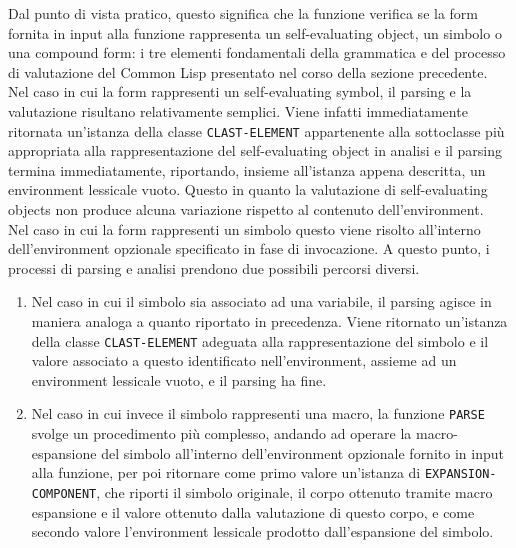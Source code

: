 Dal punto di vista pratico, questo significa che la funzione verifica se la
form fornita in input alla funzione rappresenta un self-evaluating object, un
simbolo o una compound form: i tre elementi fondamentali della grammatica e
del processo di valutazione del Common Lisp presentato nel corso della sezione
precedente.\\

Nel caso in cui la form rappresenti un self-evaluating symbol, il parsing e la
valutazione risultano relativamente semplici. Viene infatti immediatamente
ritornata un’istanza della classe \texttt{CLAST-ELEMENT} appartenente alla
sottoclasse più appropriata alla rappresentazione del self-evaluating object
in analisi e il parsing termina immediatamente, riportando, insieme
all’istanza appena descritta, un environment lessicale vuoto. Questo in quanto
la valutazione di self-evaluating objects non produce alcuna variazione
rispetto al contenuto dell'environment.\\

Nel caso in cui la form rappresenti un simbolo questo viene risolto
all’interno dell’environment opzionale specificato in fase di invocazione. A questo punto, i processi di parsing e analisi prendono due possibili percorsi diversi.

\begin{enumerate}

\item Nel caso in cui il simbolo sia associato ad una variabile, il parsing
agisce in maniera analoga a quanto riportato in precedenza. Viene ritornato
un’istanza della classe \texttt{CLAST-ELEMENT} adeguata alla rappresentazione
del simbolo e il valore associato a questo identificato nell’environment,
assieme ad un environment lessicale vuoto, e il parsing ha fine.

\item Nel caso in cui invece il simbolo rappresenti una macro, la funzione
\texttt{PARSE} svolge un procedimento più complesso, andando ad operare la
macro-espansione del simbolo all’interno dell’environment opzionale fornito in
input alla funzione, per poi ritornare come primo valore un’istanza di \texttt
{EXPANSION-COMPONENT}, che riporti il simbolo originale, il corpo ottenuto
tramite macro espansione e il valore ottenuto dalla valutazione di questo
corpo, e come secondo valore l’environment lessicale prodotto dall’espansione
del simbolo.

\end{enumerate}

